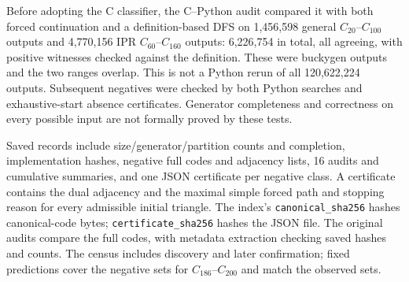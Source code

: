 \documentclass[11pt]{amsart}
\newcommand{\record}[1]{\nolinkurl{#1}}
\begin{document}
Before adopting the C classifier, the C--Python audit compared it with
both forced continuation and a definition-based DFS on 1,456,598
general $C_{20}$--$C_{100}$ outputs and 4,770,156 IPR
$C_{60}$--$C_{160}$ outputs: 6,226,754 in total, all agreeing, with
positive witnesses checked against the definition. These were buckygen
outputs and the two ranges overlap. This is not a Python rerun of all
120,622,224 outputs. Subsequent negatives were checked by both Python
searches and exhaustive-start absence certificates. Generator
completeness and correctness on every possible input are not formally
proved by these tests.

Saved records include size/generator/partition counts and completion,
implementation hashes, negative full codes and adjacency lists, 16
audits and cumulative summaries, and one JSON certificate per negative
class. A certificate contains the dual adjacency and the maximal
simple forced path and stopping reason for every admissible initial
triangle. The index's \record{canonical_sha256} hashes canonical-code
bytes; \record{certificate_sha256} hashes the JSON file. The original
audits compare the full codes, with metadata extraction checking
saved hashes and counts. The census includes discovery and later
confirmation; fixed predictions cover the negative sets for
$C_{186}$--$C_{200}$ and match the observed sets.
\end{document}
